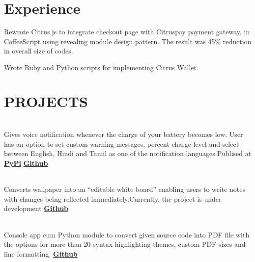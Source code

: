 \documentclass[]{deedy-resume-openfont}
\begin{document}
\begin{minipage}[t]{0.66\textwidth} 


\section{Experience}

\vspace{\topsep} 
\begin{tightemize}
\item Rewrote Citrus.js to integrate checkout page with Citruspay payment gateway, in CoffeeScript using revealing module design pattern. The result was 45\% reduction in overall size of codes. \item Wrote Ruby and Python scripts for implementing Citrus Wallet. \end{tightemize}
\sectionsep


\section{PROJECTS}
\\
Gives voice notification whenever the charge of your battery becomes low. User has an option to set custom warning messages, percent charge level and select between English, Hindi and Tamil as one of the notification languages.Publised at \textbf{\href{https://pypi.python.org/pypi/Balert}{PyPi}} \textbf{\href{https://github.com/tushar-rishav/balert}{Github}}
\sectionsep

\\
Converts wallpaper into an “editable white board” enabling users to write notes with changes being reflected immediately.Currently, the project is
under development \textbf{\href{https://github.com/tushar-rishav/wallnote}{Github}}
\sectionsep

\\
Console app cum Python module to convert given source code into PDF file with the options for more than 20 syntax highlighting themes, custom PDF sizes and line formatting. \textbf{\href{https://github.com/tushar-rishav/code2pdf}{Github}}
\sectionsep


\end{minipage}
\end{document}
